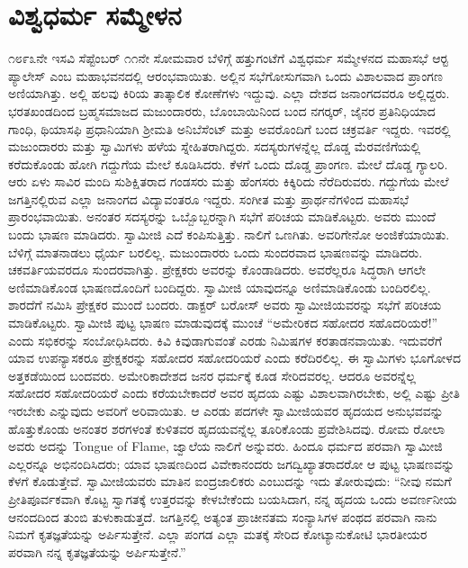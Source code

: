 
\chapter{ವಿಶ್ವಧರ್ಮ ಸಮ್ಮೇಳನ}

೧೮೯೩ನೇ ಇಸವಿ ಸೆಪ್ಟೆಂಬರ್ ೧೧ನೇ ಸೋಮವಾರ ಬೆಳಿಗ್ಗೆ ಹತ್ತುಗಂಟೆಗೆ ವಿಶ್ವಧರ್ಮ ಸಮ್ಮೇಳನದ ಮಹಾಸಭೆ ಆರ‍್ಟ ಪ್ಯಾಲೇಸ್ ಎಂಬ ಮಹಾಭವನದಲ್ಲಿ ಆರಂಭವಾಯಿತು. ಅಲ್ಲಿನ ಸಭೆಗೋಸುಗವಾಗಿ ಒಂದು ವಿಶಾಲವಾದ ಪ್ರಾಂಗಣ ಅಣಿಯಾಗಿತ್ತು. ಅಲ್ಲಿ ಹಲವು ಕಿರಿಯ ತಾತ್ಕಾಲಿಕ ಕೋಣೆಗಳು ಇದ್ದುವು. ಎಲ್ಲಾ ದೇಶದ ಜನಾಂಗದವರೂ ಅಲ್ಲಿದ್ದರು. ಭರತಖಂಡದಿಂದ ಬ್ರಹ್ಮಸಮಾಜದ ಮಜುಂದಾರರು, ಬೊಂಬಾಯಿನಿಂದ ಬಂದ ನಗರ್‍ಕರ್, ಜೈನರ ಪ್ರತಿನಿಧಿಯಾದ ಗಾಂಧಿ, ಥಿಯಾಸಫಿ ಪ್ರಧಾನಿಯಾಗಿ ಶ‍್ರೀಮತಿ ಅನಿಬೆಸೆಂಟ್ ಮತ್ತು ಅವರೊಂದಿಗೆ ಬಂದ ಚಕ್ರವರ್ತಿ ಇದ್ದರು. ಇವರಲ್ಲಿ ಮಜುಂದಾರರು ಮತ್ತು ಸ್ವಾಮಿಗಳು ಹಳೆಯ ಸ್ನೇಹಿತರಾಗಿದ್ದರು. ಸದಸ್ಯರುಗಳನ್ನೆಲ್ಲ ದೊಡ್ಡ ಮೆರವಣಿಗೆಯಲ್ಲಿ ಕರೆದುಕೊಂಡು ಹೋಗಿ ಗದ್ದುಗೆಯ ಮೇಲೆ ಕೂಡಿಸಿದರು. ಕೆಳಗೆ ಒಂದು ದೊಡ್ಡ ಪ್ರಾಂಗಣ. ಮೇಲೆ ದೊಡ್ಡ ಗ್ಯಾಲರಿ. ಆರು ಏಳು ಸಾವಿರ ಮಂದಿ ಸುಶಿಕ್ಷಿತರಾದ ಗಂಡಸರು ಮತ್ತು ಹೆಂಗಸರು ಕಿಕ್ಕಿರಿದು ನೆರೆದಿರುವರು. ಗದ್ದುಗೆಯ ಮೇಲೆ ಜಗತ್ತಿನಲ್ಲಿರುವ ಎಲ್ಲಾ ಜನಾಂಗದ ವಿದ್ಯಾವಂತರೂ ಇದ್ದರು. ಸಂಗೀತ ಮತ್ತು ಪ್ರಾರ್ಥನೆಗಳಿಂದ ಮಹಾಸಭೆ ಪ್ರಾರಂಭವಾಯಿತು. ಅನಂತರ ಸದಸ್ಯರನ್ನು ಒಬ್ಬೊಬ್ಬರನ್ನಾಗಿ ಸಭೆಗೆ ಪರಿಚಯ ಮಾಡಿಕೊಟ್ಟರು. ಅವರು ಮುಂದೆ ಬಂದು ಭಾಷಣ ಮಾಡಿದರು. ಸ್ವಾಮೀಜಿ ಎದೆ ಕಂಪಿಸುತ್ತಿತ್ತು. ನಾಲಿಗೆ ಒಣಗಿತು. ಅವರಿಗೇನೋ ಅಂಜಿಕೆಯಾಯಿತು. ಬೆಳಿಗ್ಗೆ ಮಾತನಾಡಲು ಧೈರ್ಯ ಬರಲಿಲ್ಲ. ಮಜುಂದಾರರು ಒಂದು ಸುಂದರವಾದ ಭಾಷಣವನ್ನು ಮಾಡಿದರು. ಚಕವರ್ತಿಯವರದೂ ಸುಂದರವಾಗಿತ್ತು. ಪ್ರೇಕ್ಷಕರು ಅವರನ್ನು ಕೊಂಡಾಡಿದರು. ಅವರೆಲ್ಲರೂ ಸಿದ್ಧರಾಗಿ ಆಗಲೇ ಅಣಿಮಾಡಿಕೊಂಡ ಭಾಷಣದೊಂದಿಗೆ ಬಂದಿದ್ದರು. ಸ್ವಾಮೀಜಿ ಯಾವುದನ್ನೂ ಅಣಿಮಾಡಿಕೊಂಡು ಬಂದಿರಲಿಲ್ಲ. ಶಾರದೆಗೆ ನಮಿಸಿ ಪ್ರೇಕ್ಷಕರ ಮುಂದೆ ಬಂದರು. ಡಾಕ್ಟರ್ ಬರೋಸ್ ಅವರು ಸ್ವಾಮೀಜಿಯವರನ್ನು ಸಭೆಗೆ ಪರಿಚಯ ಮಾಡಿಕೊಟ್ಟರು. ಸ್ವಾಮೀಜಿ ಪುಟ್ಟ ಭಾಷಣ ಮಾಡುವುದಕ್ಕೆ ಮುಂಚೆ “ಅಮೇರಿಕದ ಸಹೋದರ ಸಹೊದರಿಯರೆ!” ಎಂದು ಸಭಿಕರನ್ನು ಸಂಬೋಧಿಸಿದರು. ಕಿವಿ ಕಿವುಡಾಗುವಂತೆ ಎರಡು ನಿಮಿಷಗಳ ಕರತಾಡನವಾಯಿತು. ಇದುವರೆಗೆ ಯಾವ ಉಪನ್ಯಾಸಕರೂ ಪ್ರೇಕ್ಷಕರನ್ನು ಸಹೋದರ ಸಹೋದರಿಯರೆ ಎಂದು ಕರೆದಿರಲಿಲ್ಲ. ಈ ಸ್ವಾಮಿಗಳು ಭೂಗೋಳದ ಅತ್ತಕಡೆಯಿಂದ ಬಂದವರು. ಅಮೇರಿಕಾದೇಶದ ಜನರ ಧರ್ಮಕ್ಕೆ ಕೂಡ ಸೇರಿದವರಲ್ಲ. ಆದರೂ ಅವರನ್ನೆಲ್ಲ ಸಹೋದರ ಸಹೋದರಿಯರೆ ಎಂದು ಕರೆಯಬೇಕಾದರೆ ಅವರ ಹೃದಯ ಎಷ್ಟು ವಿಶಾಲವಾಗಿರಬೇಕು, ಅಲ್ಲಿ ಎಷ್ಟು ಪ್ರೀತಿ ಇರಬೇಕು ಎನ್ನುವುದು ಅವರಿಗೆ ಅರಿವಾಯಿತು. ಆ ಎರಡು ಪದಗಳೇ ಸ್ವಾಮೀಜಿಯವರ ಹೃದಯದ ಅನುಭವವನ್ನು ಹೊತ್ತುಕೊಂಡು ಅನಂತರ ಶರಗಳಂತೆ ಕುಳಿತವರ ಹೃದಯವನ್ನೆಲ್ಲ ತೂರಿಕೊಂಡು ಪ್ರವೇಶಿಸಿದವು. ರೋಮ ರೋಲಾ ಅವರು ಅದನ್ನು Tongue of Flame, ಜ್ವಾಲೆಯ ನಾಲಿಗೆ ಅನ್ನುವರು. ಹಿಂದೂ ಧರ್ಮದ ಪರವಾಗಿ ಸ್ವಾಮೀಜಿ ಎಲ್ಲರನ್ನೂ ಅಭಿನಂದಿಸಿದರು; ಯಾವ ಭಾಷಣದಿಂದ ವಿವೇಕಾನಂದರು ಜಗದ್ವಿಖ್ಯಾತರಾದರೋ ಆ ಪುಟ್ಟ ಭಾಷಣವನ್ನು ಕೆಳಗೆ ಕೊಡುತ್ತೇವೆ. ಸ್ವಾಮೀಜಿಯವರು ಮಾತಿನ ಐಂದ್ರಜಾಲಿಕರು ಎಂಬುದನ್ನು ಇದು ತೋರುವುದು: “ನೀವು ನಮಗೆ ಪ್ರೀತಿಪೂರ್ವಕವಾಗಿ ಕೊಟ್ಟ ಸ್ವಾಗತಕ್ಕೆ ಉತ್ತರವನ್ನು ಕೇಳಬೇಕೆಂದು ಬಯಸಿದಾಗ, ನನ್ನ ಹೃದಯ ಒಂದು ಅವರ್ಣನೀಯ ಆನಂದದಿಂದ ತುಂಬಿ ತುಳುಕಾಡುತ್ತದೆ. ಜಗತ್ತಿನಲ್ಲಿ ಅತ್ಯಂತ ಪ್ರಾಚೀನತಮ ಸಂನ್ಯಾಸಿಗಳ ಪಂಥದ ಪರವಾಗಿ ನಾನು ನಿಮಗೆ ಕೃತಜ್ಞತೆಯನ್ನು ಅರ್ಪಿಸುತ್ತೇನೆ. ಎಲ್ಲಾ ಪಂಗಡ ಎಲ್ಲಾ ಮತಕ್ಕೆ ಸೇರಿದ ಕೋಟ್ಯಾನುಕೋಟಿ ಭಾರತೀಯರ ಪರವಾಗಿ ನನ್ನ ಕೃತಜ್ಞತೆಯನ್ನು ಅರ್ಪಿಸುತ್ತೇನೆ.” 

